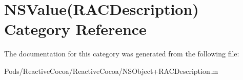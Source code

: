 \hypertarget{category_n_s_value_07_r_a_c_description_08}{}\section{N\+S\+Value(R\+A\+C\+Description) Category Reference}
\label{category_n_s_value_07_r_a_c_description_08}


The documentation for this category was generated from the following file\+:\begin{DoxyCompactItemize}
\item 
Pods/\+Reactive\+Cocoa/\+Reactive\+Cocoa/N\+S\+Object+\+R\+A\+C\+Description.\+m\end{DoxyCompactItemize}
